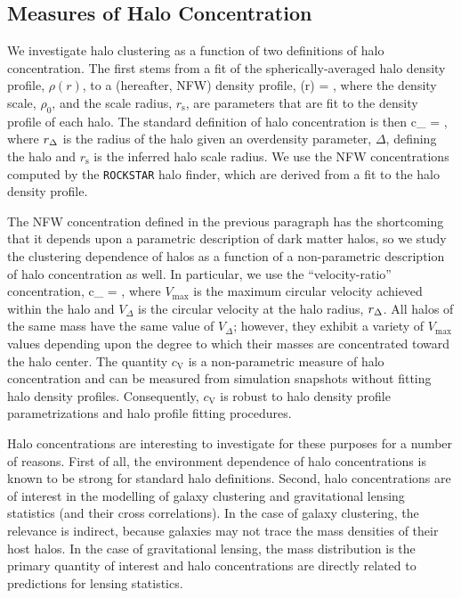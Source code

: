 \documentclass[usenatbib,fleqn]{mnras}
\begin{document}
\subsection{Measures of Halo Concentration}

We investigate halo clustering as a function of two definitions of halo concentration. The first stems from a fit of the spherically-averaged halo density profile, $\rho(r)$, to a \citet{navarro_etal97} (hereafter, NFW) density profile, 
%
\beq
\rho(r) = ,
\eeq
%
where the density scale, $\rho_0$, and the scale radius, $r_{\mathrm{s}}$, are parameters that are fit to the density profile of each halo. The standard definition of halo concentration is then 
\beq
c_{} = ,
\eeq
where $r_{\Delta}$ is the radius of the halo given an overdensity parameter, $\Delta$, defining the halo and $r_{\mathrm{s}}$ is the inferred halo scale radius. We use the NFW concentrations computed by the {\tt ROCKSTAR} halo finder, which are derived from a fit to the halo density profile.  


The NFW concentration defined in the previous paragraph has the shortcoming that it 
depends upon a parametric description of dark matter halos, so we study the clustering dependence of halos as a function of a non-parametric description of halo concentration as well. In particular, we use the ``velocity-ratio'' concentration,
\beq
c_{} = , 
\eeq
where $V_{\mathrm{max}}$ is the maximum circular velocity achieved within the halo and $V_{\Delta}$ is the circular velocity at the halo radius, $r_{\Delta}$. All halos of the same mass have the same value of $V_{\Delta}$; however, 
they exhibit a variety of $V_{\mathrm{max}}$ values depending upon the degree to which their masses are concentrated toward the halo center. The quantity $c_{\mathrm{V}}$ is a non-parametric measure of halo concentration and can be measured from simulation snapshots without fitting halo density profiles. Consequently, $c_{\mathrm{V}}$ is robust to halo density profile parametrizations and halo profile fitting procedures. 

Halo concentrations are interesting to investigate for these purposes for a number of reasons. First of all, the environment dependence of halo concentrations is known to be strong for standard halo definitions. Second, halo concentrations are of interest in the modelling of galaxy clustering and gravitational lensing statistics (and their cross correlations). In the case of galaxy clustering, the relevance is indirect, because galaxies may not trace the mass densities of their host halos. In the case 
of gravitational lensing, the mass distribution is the primary quantity of interest and halo concentrations are directly related to predictions for lensing statistics. 
\end{document}
